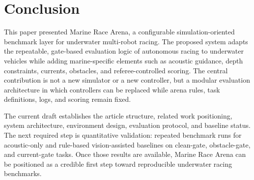 \section{Conclusion}

This paper presented Marine Race Arena, a configurable simulation-oriented benchmark layer for underwater multi-robot racing. The proposed system adapts the repeatable, gate-based evaluation logic of autonomous racing to underwater vehicles while adding marine-specific elements such as acoustic guidance, depth constraints, currents, obstacles, and referee-controlled scoring. The central contribution is not a new simulator or a new controller, but a modular evaluation architecture in which controllers can be replaced while arena rules, task definitions, logs, and scoring remain fixed.

The current draft establishes the article structure, related work positioning, system architecture, environment design, evaluation protocol, and baseline status. The next required step is quantitative validation: repeated benchmark runs for acoustic-only and rule-based vision-assisted baselines on clean-gate, obstacle-gate, and current-gate tasks. Once those results are available, Marine Race Arena can be positioned as a credible first step toward reproducible underwater racing benchmarks.
